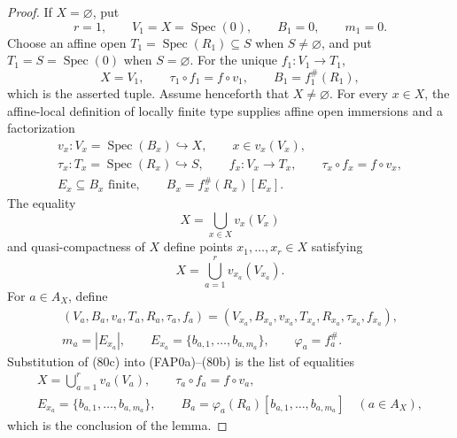 \begin{proof}
  If $X=\varnothing$, put
  \[
    r=1,\qquad
    V_1=X=\operatorname{Spec}(0),\qquad
    B_1=0,\qquad m_1=0.
  \]
  Choose an affine open $T_1=\operatorname{Spec}(R_1)\subseteq S$ when
  $S\neq\varnothing$, and put $T_1=S=\operatorname{Spec}(0)$ when
  $S=\varnothing$.  For the unique $f_1\colon V_1\to T_1$,
  \[
    X=V_1,\qquad
    \tau_1\circ f_1=f\circ v_1,\qquad
    B_1=f_1^\#(R_1),
  \]
  which is the asserted tuple.  Assume henceforth that $X\neq\varnothing$.
  For every $x\in X$, the affine-local definition of locally finite type
  supplies affine open immersions and a factorization
  \[
  \begin{gathered}
    v_x\colon V_x=\operatorname{Spec}(B_x)\hookrightarrow X,\qquad
    x\in v_x(V_x),\\
    \tau_x\colon T_x=\operatorname{Spec}(R_x)\hookrightarrow S,\qquad
    f_x\colon V_x\to T_x,\qquad
    \tau_x\circ f_x=f\circ v_x,\\
    E_x\subseteq B_x\text{ finite},\qquad
    B_x=f_x^\#(R_x)[E_x].
  \end{gathered}                                                   \tag{FAP0a}
  \]
  The equality
  \[
    X=\bigcup_{x\in X}v_x(V_x)
  \]
  and quasi-compactness of $X$ define points
  $x_1,\ldots,x_r\in X$ satisfying
  \[
    X=\bigcup_{a=1}^r v_{x_a}(V_{x_a}).                           \tag{80b}
  \]
  For $a\in A_X$, define
  \[
  \begin{gathered}
    (V_a,B_a,v_a,T_a,R_a,\tau_a,f_a)
      =(V_{x_a},B_{x_a},v_{x_a},T_{x_a},R_{x_a},\tau_{x_a},f_{x_a}),\\
    m_a=|E_{x_a}|,\qquad
    E_{x_a}=\{b_{a,1},\ldots,b_{a,m_a}\},\qquad
    \varphi_a=f_a^\#.
  \end{gathered}                                                   \tag{80c}
  \]
  Substitution of (80c) into (FAP0a)--(80b) is the list of equalities
  \[
  \begin{gathered}
    X=\bigcup_{a=1}^{r}v_a(V_a),
    \qquad
    \tau_a\circ f_a=f\circ v_a,\\
    E_{x_a}=\{b_{a,1},\ldots,b_{a,m_a}\},
    \qquad
    B_a=\varphi_a(R_a)[b_{a,1},\ldots,b_{a,m_a}]
      \quad(a\in A_X),
  \end{gathered}
  \]
  which is the conclusion of the lemma.
\end{proof}

